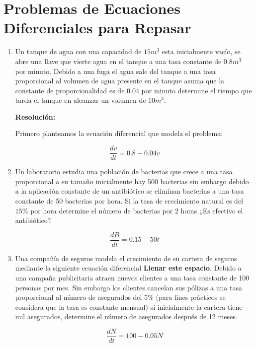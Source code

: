 \documentclass[10pt,a4paper]{article}
\begin{document}
    \section{Problemas de Ecuaciones Diferenciales para Repasar}

	\begin{enumerate}
		\item Un tanque de agua con una capacidad de $15 m^3$ esta inicialmente vacío, se abre una llave que vierte agua en el tanque a una tasa constante de $0.8 m^3$ por minuto. Debido a una fuga el agua sale del tanque a una tasa proporcional al volumen de agua presente en el tanque asuma que la constante de proporcionalidad es de $0.04$ por minuto determine el tiempo que tarda el tanque en alcanzar un volumen de $10m^3$.
		
        \textbf{Resolución:}

        Primero planteamos la ecuación diferencial que modela el problema:

        $$\frac{dv}{dt} = 0.8 - 0.04v$$

        

        \item Un laboratorio estudia una población de bacterias que crece a una tasa proporcional a su tamaño inicialmente hay 500 bacterias sin embargo debido a la aplicación constante de un antibiótico se eliminan bacterias a una tasa constante de 50 bacterias por hora. Si la tasa de crecimiento natural es del $15\%$ por hora determine el número de bacterias por 2 horas ¿Es efectivo el antibiótico?

        $$\frac{dB}{dt} = 0.15 - 50t$$

        \item Una compañía de seguros modela el crecimiento de su cartera de seguros mediante la siguiente ecuación diferencial \textbf{Llenar este espacio}. Debido a una campaña publicitaria atraen nuevos clientes a una tasa constante de 100 personas por mes. Sin embargo los clientes cancelan sus pólizas a una tasa proporcional al número de asegurados del 5\% (para fines prácticos se considera que la tasa es constante mensual) si inicialmente la cartera tiene mil asegurados, determine el número de asegurados después de 12 meses.

        $$\frac{dN}{dt} = 100 - 0.05N$$



	\end{enumerate}	
\end{document}
